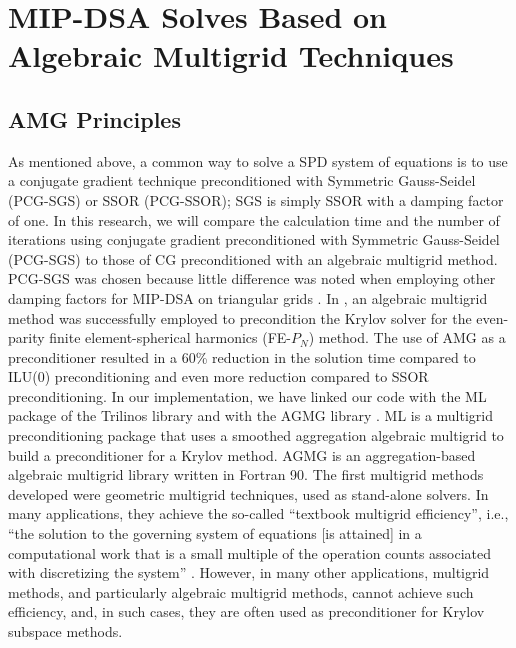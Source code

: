 \section{MIP-DSA Solves Based on Algebraic Multigrid Techniques} \label{sec_amg}

\subsection{AMG Principles}

As mentioned above, a common way to solve a SPD system of equations is to use a 
conjugate gradient technique preconditioned  with Symmetric Gauss-Seidel (PCG-SGS)
or SSOR (PCG-SSOR); SGS is simply SSOR with a damping factor of one. In this research, we
will compare the calculation time and the number of iterations using conjugate 
gradient preconditioned with Symmetric Gauss-Seidel (PCG-SGS) to those of CG preconditioned with an
algebraic multigrid method. PCG-SGS was chosen because little difference was noted 
when employing other damping factors for MIP-DSA on triangular grids \cite{wang_personal_comm}. 
In \cite{amg_pn}, an algebraic multigrid method was successfully employed to precondition 
the Krylov solver for the even-parity finite element-spherical harmonics
(FE-$P_N$) method. The use of AMG as a 
preconditioner resulted in a 60\% reduction in the solution time compared to 
ILU(0) preconditioning and even more reduction compared to SSOR preconditioning. 
In our implementation, we have linked our code with the ML package 
\cite{ml_guide} of the Trilinos library and with the AGMG library \cite{agmg_guide}. 
ML is a multigrid preconditioning package that uses a smoothed aggregation 
algebraic multigrid to build a preconditioner for a Krylov method. AGMG is an 
aggregation-based algebraic multigrid library written in Fortran 90.
%
The first multigrid methods developed were geometric multigrid techniques, used as 
stand-alone solvers. In many applications, they achieve the so-called 
``textbook multigrid efficiency'', i.e., ``the solution to the governing 
system of equations [is attained] in a computational work that is a small 
multiple of the operation counts associated with discretizing the system'' 
\cite{textbook_eff}. However, in many other applications, multigrid methods, 
and particularly algebraic multigrid methods, cannot achieve such efficiency, 
\cite{k_cycle} and, in such cases, they are often used as preconditioner for 
Krylov subspace methods. 

